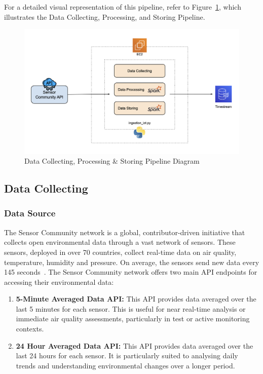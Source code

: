 \documentclass[12pt,oneside]{book} %
\begin{document}
For a detailed visual representation of this pipeline, refer to
Figure~\ref{fig:data-collecting-processing-storing-pipeline}, which illustrates
the Data Collecting, Processing, and Storing Pipeline.

\begin{figure}[H]
    \centering
    \includegraphics[width=1\linewidth]{images/cloud-computing-data-ingestion.png}
    \caption{Data Collecting, Processing \& Storing Pipeline Diagram}\label{fig:data-collecting-processing-storing-pipeline}
\end{figure}

\subsection{Data Collecting}
\subsubsection{Data Source}
The Sensor Community network is a global, contributor-driven initiative that
collects open environmental data through a vast network of sensors. These
sensors, deployed in over 70 countries, collect real-time data on air quality,
temperature, humidity and pressure. On average, the sensors send new data every
145 seconds~\cite{sensorcommunity2023synchronization}. The Sensor Community
network offers two main API endpoints for accessing their environmental data:

\begin{enumerate}
    \item \textbf{5-Minute Averaged Data API:} This API provides data averaged over the last 5 minutes for each sensor. This is useful for near real-time analysis or immediate air quality assessments, particularly in test or active monitoring contexts.
    \item \textbf{24 Hour Averaged Data API:} This API provides data averaged over the last 24 hours for each sensor. It is particularly suited to analysing daily trends and understanding environmental changes over a longer period.
\end{enumerate}
\end{document}
